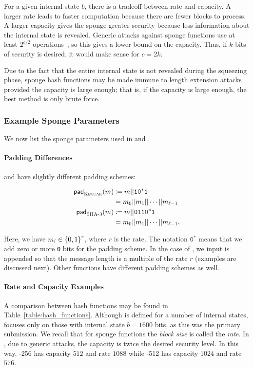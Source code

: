 For a given internal state $b$, there is a tradeoff
between rate and capacity.
A larger rate leads to faster computation
because there are fewer blocks to process.
A larger capacity gives the sponge greater security
because less information about the internal state is revealed.
Generic attacks against sponge functions use at least
$2^{c/2}$ operations~\cite[Chapter 5]{KeccakSponge2011},
so this gives a lower bound on the capacity.
Thus, if $k$ bits of security is desired,
it would make sense for $c = 2k$.

Due to the fact that the entire internal state is not revealed
during the squeezing phase,
sponge \glspl{hash function} may be made immune to length extension attacks
provided the capacity is large enough;
that is, if the capacity is large enough, the best method is only
brute force.

\subsubsection{Example Sponge Parameters}

We now list the sponge parameters used in
\Keccak{} and \ShaThree{}.

\paragraph{Padding Differences}
\Keccak{} and \ShaThree{} have slightly different padding schemes:

\begin{align}
    \textsf{pad}_{\text{\Keccak{}}}(m) &\mathDef{}
            m||\texttt{10}^{*}\texttt{1} \nonumber\\
        &= m_{0}||m_{1}||\cdots||m_{\ell-1} \nonumber\\
    \textsf{pad}_{\text{\ShaThree{}}}(m) &\mathDef{}
            m||\texttt{0110}^{*}\texttt{1} \nonumber\\
        &= m_{0}||m_{1}||\cdots||m_{\ell-1}.
\end{align}

\noindent
Here, we have $m_{i}\in\left\{ 0,1 \right\}^{r}$, where $r$ is the rate.
The notation $\texttt{0}^{*}$ means that we add zero or more \texttt{0} bits
for the padding scheme.
In the case of \Keccak{}, we input is appended so that the message
length is a multiple of the rate $r$ (examples are discussed next).
Other \ShaThree{} functions have different padding schemes as well.

\paragraph{Rate and Capacity Examples}
A comparison between \glspl{hash function} may be found in
Table~\ref{table:hash_functions}.
Although \Keccak{} is defined for a number of internal states,
\ShaThree{} focuses only on those with internal state $b=1600$ bits,
as this was the primary submission.
We recall that for sponge functions the \emph{block size}
is called the \emph{rate}.
In \ShaThree{}, due to generic attacks, the capacity is twice
the desired security level.
In this way, \ShaThree{}-256 has capacity $512$ and rate $1088$
while \ShaThree{}-512 has capacity $1024$ and rate $576$.
